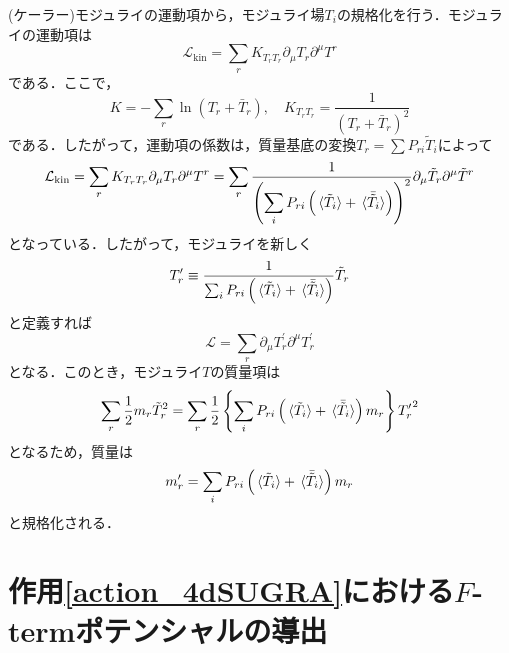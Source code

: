 \documentclass[a4paper,uplatex,dvipdfmx,10pt]{jsarticle}
\theoremstyle{definition}
\begin{document}
(ケーラー)モジュライの運動項から，モジュライ場$T_{i}$の規格化を行う．モジュライの運動項は
\begin{equation}
   \mathcal{L}_{\text{kin}}
   =
   \sum_{r}
   K_{T_{r}T_{r}}
   \partial_{\mu}T_{r}
   \partial^{\mu}T^{r}
   \nonumber
\end{equation}
である．ここで，
\begin{equation}
   K
   =
   -
   \sum_{r}
   \ln(T_{r}+\bar{T}_{r})
   ,\quad
   K_{T_{r}T_{r}}
   =
   \frac{1}{(T_{r}+\bar{T}_{r})^2}
   \nonumber
\end{equation}
である．したがって，運動項の係数は，質量基底の変換$T_{r}=\sum P_{ri}\tilde{T}_{i}$によって
\begin{equation}
   \mathcal{L}_{\text{kin}}
   =
   \sum_{r}
   K_{T_{r}T_{r}}
   \partial_{\mu}T_{r}
   \partial^{\mu}T^{r}
   =
   \sum_{r}
   \frac{1}{\left(
      \displaystyle
      \sum_{i}P_{ri}\left(\ev*{\tilde{T}_{i}}+\ev*{\bar{\tilde{T}}_{i}}\right)\right)^2
   }   
   \partial_{\mu}\tilde{T}_{r}
   \partial^{\mu}\tilde{T}^{r}
   \nonumber
\end{equation}
となっている．したがって，モジュライを新しく
\begin{equation}
   T^{\prime}_{r}
   \equiv
   \dfrac{1}{\sum_{i}P_{ri}\left(\ev*{\tilde{T}_{i}}+\ev*{\bar{\tilde{T}}_{i}}\right)}\tilde{T}_{r}
   \nonumber
\end{equation}
と定義すれば
\begin{equation}
   \mathcal{L}
   =
   \sum_{r}\partial_{\mu}T^{\prime}_{r}\partial^{\mu}T^{\prime}_{r}
   \nonumber
\end{equation}
となる．このとき，モジュライ$T$の質量項は
\begin{equation}
   \sum_{r}\frac{1}{2}m_{r}\tilde{T}_{r}^2
   =
   \sum_{r}\frac{1}{2}
   \left\{
   \sum_{i}P_{ri}\left(\ev*{\tilde{T}_{i}}+\ev*{\bar{\tilde{T}}_{i}}\right)
   m_{r}
   \right\}
   {T^{\prime}_{r}}^2
   \nonumber
\end{equation}
となるため，質量は
\begin{equation}
   m_{r}^{\prime}
   =   
   \sum_{i}P_{ri}\left(\ev*{\tilde{T}_{i}}+\ev*{\bar{\tilde{T}}_{i}}\right)
   m_{r}
   \label{normalized_mass}
\end{equation}
と規格化される．


\section{作用\texorpdfstring{\eqref{action_4dSUGRA}}{2.9}における\texorpdfstring{$F$}{F}-termポテンシャルの導出}
\end{document}
